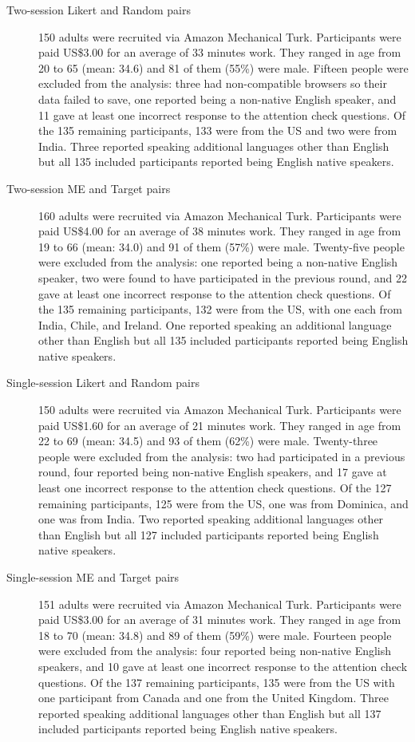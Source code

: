 \documentclass[doc]{apa6}
\newcommand{\targchoice}{{\sc Target pairs}}
\newcommand{\rndchoice}{{\sc Random pairs}}
\newcommand{\ME}{{\sc ME}}%
\newcommand{\likert}{{\sc Likert}}
\begin{document}
\vspace{2mm}
\begin{description}

\item[Two-session \likert{} and \rndchoice] 150 adults were recruited via Amazon Mechanical Turk. Participants were paid US\$3.00 for an average of 33 minutes work. They ranged in age from 20 to 65 (mean: 34.6) and 81 of them (55\%) were male. Fifteen people were excluded from the analysis: three had non-compatible browsers so their data failed to save, one reported being a non-native English speaker, and 11 gave at least one incorrect response to the attention check questions. Of the 135 remaining participants, 133 were from the US and two were from India. Three reported speaking additional languages other than English but all 135 included participants reported being English native speakers.

\item[Two-session \ME{} and \targchoice] 160 adults were recruited via Amazon Mechanical Turk.
Participants were paid US\$4.00 for an average of 38 minutes work. They ranged in age from 19 to 66 (mean: 34.0) and 91 of them (57\%) were male. Twenty-five people were excluded from the analysis: one reported being a non-native English speaker, two were found to have participated in the previous round, and 22 gave at least one incorrect response to the attention check questions. Of the 135 remaining participants, 132 were from the US, with one each from India, Chile, and Ireland. One reported speaking an additional language other than English but all 135 included participants reported being English native speakers.

\item[Single-session \likert{} and \rndchoice] 150 adults were recruited via Amazon Mechanical Turk. Participants were paid US\$1.60 for an average of 21 minutes work. They ranged in age from 22 to 69 (mean: 34.5) and 93 of them (62\%) were male. Twenty-three people were excluded from the analysis: two had participated in a previous round, four reported being non-native English speakers, and 17 gave at least one incorrect response to the attention check questions. Of the 127 remaining participants, 125 were from the US, one was from Dominica, and one was from India. Two reported speaking additional languages other than English but all 127 included participants reported being English native speakers.

\item[Single-session \ME{} and \targchoice] 151 adults were recruited via Amazon Mechanical Turk. Participants were paid US\$3.00 for an average of 31 minutes work. They ranged in age from 18 to 70 (mean: 34.8) and 89 of them (59\%) were male. Fourteen people were excluded from the analysis: four reported being non-native English speakers, and 10 gave at least one incorrect response to the attention check questions. Of the 137 remaining participants, 135 were from the US with one participant from Canada and one from the United Kingdom. Three reported speaking additional languages other than English but all 137 included participants reported being English native speakers.

\end{description}
\end{document}
